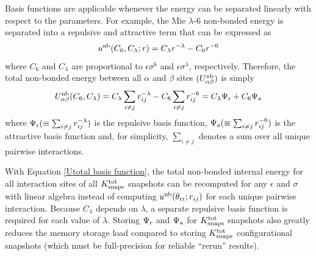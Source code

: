 \documentclass[journal=jced,manuscript=article]{achemso}
\begin{document}
Basis functions are applicable whenever the energy can be separated linearly with respect to the parameters. For example, the Mie $\lambda$-6 non-bonded energy is separated into a repulsive and attractive term that can be expressed as
\begin{equation} \label{Mie basis function}
u^{\rm nb}(C_6,C_\lambda;r) = C_\lambda r^{-\lambda} - C_6 r^{-6}
\end{equation} 
where $C_6$ and $C_\lambda$ are proportional to $\epsilon \sigma^6$ and $\epsilon \sigma^\lambda$, respectively. Therefore, the total non-bonded energy between all $\alpha$ and $\beta$ sites $(U_{\alpha\beta}^{\rm nb})$ is simply
\begin{equation} \label{Utotal basis function}
U_{\alpha\beta}^{\rm nb}(C_6,C_\lambda) = C_\lambda \sum_{i \neq j} r_{ij}^{-\lambda} - C_6 \sum_{i \neq j} r_{ij}^{-6} = C_\lambda \Psi_{\rm r} + C_6 \Psi_{\rm a}
\end{equation}
where $\Psi_{\rm r} (\equiv \sum_{i \neq j} r_{ij}^{-\lambda})$ is the repulsive basis function, $\Psi_{\rm a} (\equiv \sum_{i \neq j} r_{ij}^{-6})$ is the attractive basis function and, for simplicity, $\sum_{i \neq j}$ denotes a sum over all unique pairwise interactions.

With Equation \ref{Utotal basis function}, the total non-bonded internal energy for all interaction sites of all $K^{\rm tot}_{\rm snaps}$ snapshots can be recomputed for any $\epsilon$ and $\sigma$ with linear algebra instead of computing $u^{\rm nb}(\theta_{\rm rr};r_{ij})$ for each unique pairwise interaction. Because $C_\lambda$ depends on $\lambda$, a separate repulsive basis function is required for each value of $\lambda$. Storing $\Psi_{\rm r}$ and $\Psi_{\rm a}$ for $K^{\rm tot}_{\rm snaps}$ snapshots also greatly reduces the memory storage load compared to storing $K^{\rm tot}_{\rm snaps}$ configurational snapshots (which must be full-precision for reliable ``rerun'' results).


%
%
%
\end{document}
